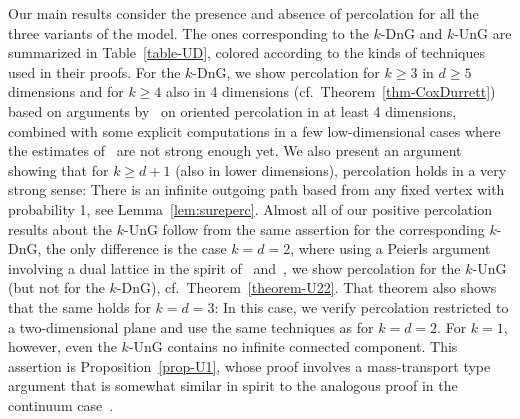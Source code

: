\documentclass[oneside]{amsart}
\theoremstyle{definition}
\newcommand{\1}{\mathbbm{1}}
\newcommand{\0}{\mathbf{o}}
\numberwithin{equation}{section}
\begin{document}
Our main results consider the presence and absence of percolation for all the three variants of the model. The ones corresponding to the $k$-DnG and $k$-UnG are summarized in Table~\ref{table-UD}, colored according to the kinds of techniques used in their proofs. For the $k$-DnG, we show percolation for $k\geq 3$ in $d\geq 5$ dimensions and for $k \geq 4$ also in 4 dimensions (cf.~Theorem~\ref{thm-CoxDurrett}) based on arguments by~\cite{CoxDurrett} on oriented percolation in at least 4 dimensions, combined with some explicit computations in a few low-dimensional cases where the estimates of~\cite{CoxDurrett} are not strong enough yet. We also present an argument showing that for $k \geq d+1$ (also in lower dimensions), percolation holds in a very strong sense: There is an infinite outgoing path based from any fixed vertex with probability 1, see Lemma~\ref{lem:sureperc}.
Almost all of our positive percolation results about the $k$-UnG follow from the same assertion for the corresponding $k$-DnG, the only difference is the case $k=d=2$, where using a Peierls argument involving a dual lattice in the spirit of~\cite{Durr88} and~\cite{JanSwart}, we show percolation for the $k$-UnG (but not for the $k$-DnG), cf.\ Theorem~\ref{theorem-U22}. That theorem also shows that the same holds for $k=d=3$: In this case, we verify percolation restricted to a two-dimensional plane and use the same techniques as for $k=d=2$. For $k=1$, however, even the $k$-UnG contains no infinite connected component. This assertion is Proposition~\ref{prop-U1}, whose proof involves a mass-transport type argument that is somewhat similar in spirit to the analogous proof in the continuum case~\cite{HaggMee96}.
\end{document}
